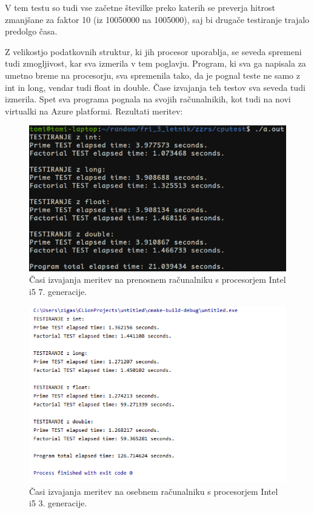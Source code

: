 V tem testu so tudi vse začetne številke preko katerih se preverja hitrost zmanjšane za faktor 10 (iz 10050000 na 1005000), saj bi drugače testiranje trajalo predolgo časa.

Z velikostjo podatkovnih struktur, ki jih procesor uporablja, se seveda spremeni tudi zmogljivost, kar sva izmerila v tem poglavju. Program, ki sva ga napisala za umetno breme na procesorju, sva spremenila tako, da je pognal teste ne samo z int in long, vendar tudi float in double. Čase izvajanja teh testov sva seveda tudi izmerila. Spet sva programa pognala na svojih računalnikih, kot tudi na novi virtualki na Azure platformi. Rezultati meritev:

\begin{figure}[H]
	\centering
	\includegraphics[scale=0.55]{Img/T_cputest2.png}
	\caption{Časi izvajanja meritev na prenosnem računalniku s procesorjem Intel i5 7. generacije.}
	\label{fig:7_breme2}
\end{figure}

\begin{figure}[H]
	\centering
	\includegraphics[scale=0.63]{Img/Z_cputest2.png}
	\caption{Časi izvajanja meritev na osebnem računalniku s procesorjem Intel i5 3. generacije.}
	\label{fig:7_breme2}
\end{figure}

